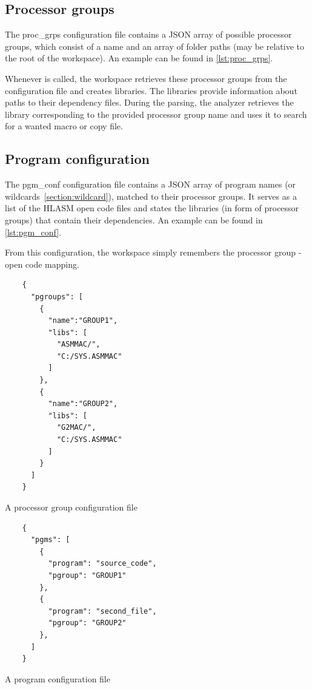 \subsection{Processor groups}

The proc\_grps configuration file contains a JSON array of possible processor groups, which consist of a name and an array of folder paths (may be relative to the root of the workspace). An example can be found in \cref{lst:proc_grps}.

Whenever  is called, the workspace retrieves these processor groups from the configuration file and creates libraries. The libraries provide information about paths to their dependency files. During the parsing, the analyzer retrieves the library corresponding to the provided processor group name and uses it to search for a wanted macro or copy file. 

\subsection{Program configuration}

The pgm\_conf configuration file contains a JSON array of program names (or wildcards~\ref{section:wildcard}), matched to their processor groups. It serves as a list of the HLASM open code files and states the libraries (in form of processor groups) that contain their dependencies. An example can be found in \cref{lst:pgm_conf}.


From this configuration, the workspace simply remembers the processor group - open code mapping.


\begin{listing}[t]
	\begin{verbatim}
	{
	  "pgroups": [
	    {
	      "name":"GROUP1",
	      "libs": [
	        "ASMMAC/",
	        "C:/SYS.ASMMAC"
	      ]
	    },
	    {
	      "name":"GROUP2",
	      "libs": [
	        "G2MAC/",
	        "C:/SYS.ASMMAC"
	      ]
	    }
	  ]
	}
	\end{verbatim}
	\caption{A processor group configuration file}
	\label{lst:proc_grps}
\end{listing}

\begin{listing}[t]
	\begin{verbatim}
	{
	  "pgms": [
	    {
	      "program": "source_code",
	      "pgroup": "GROUP1"
	    },
	    {
	      "program": "second_file",
	      "pgroup": "GROUP2"
	    },
	  ]
	}
	\end{verbatim}
	\caption{A program configuration file}
	\label{lst:pgm_conf}
\end{listing}


